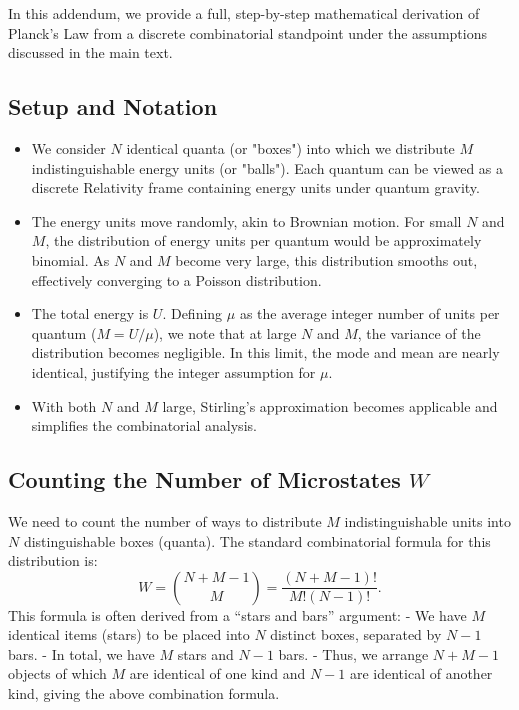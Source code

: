 \documentclass{article}
\begin{document}
In this addendum, we provide a full, step-by-step mathematical derivation of Planck’s Law from a discrete combinatorial standpoint under the assumptions discussed in the main text.

\subsection*{Setup and Notation}

\begin{itemize}
    \item We consider $N$ identical quanta (or "boxes") into which we distribute $M$ indistinguishable energy units (or "balls"). Each quantum can be viewed as a discrete Relativity frame containing energy units under quantum gravity.
    \item The energy units move randomly, akin to Brownian motion. For small $N$ and $M$, the distribution of energy units per quantum would be approximately binomial. As $N$ and $M$ become very large, this distribution smooths out, effectively converging to a Poisson distribution.
    \item The total energy is $U$. Defining $\mu$ as the average integer number of units per quantum ($M=U/\mu$), we note that at large $N$ and $M$, the variance of the distribution becomes negligible. In this limit, the mode and mean are nearly identical, justifying the integer assumption for $\mu$.
    \item With both $N$ and $M$ large, Stirling’s approximation becomes applicable and simplifies the combinatorial analysis.
\end{itemize}


\subsection*{Counting the Number of Microstates $W$}

We need to count the number of ways to distribute $M$ indistinguishable units into $N$ distinguishable boxes (quanta). The standard combinatorial formula for this distribution is:
\[
W = \binom{N + M - 1}{M} = \frac{(N + M - 1)!}{M! (N-1)!}.
\]
\newline
This formula is often derived from a “stars and bars” argument:\newline
- We have $M$ identical items (stars) to be placed into $N$ distinct boxes, separated by $N-1$ bars. \newline
- In total, we have $M$ stars and $N-1$ bars. \newline
- Thus, we arrange $N + M - 1$ objects of which $M$ are identical of one kind and $N-1$ are identical of another kind, giving the above combination formula.\newline
\end{document}

